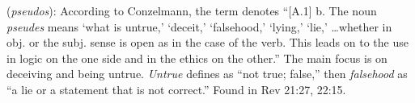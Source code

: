 \item[Falsehood,]

(\textit{pseudos}):
According to Conzelmann, the term denotes ``[A.1] b. The noun \emph{pseudes} means `what is untrue,' `deceit,' `falsehood,' `lying,' `lie,' \ldots whether in obj. or the subj. sense is open as in the case of the verb. This leads on to the use in logic on the one side and in the ethics on the other.''
The main focus is on deceiving and being untrue. \emph{Untrue} defines as ``not true; false,'' then \emph{falsehood} as ``a lie or a statement that is not correct.''
Found in Rev 21:27, 22:15.
